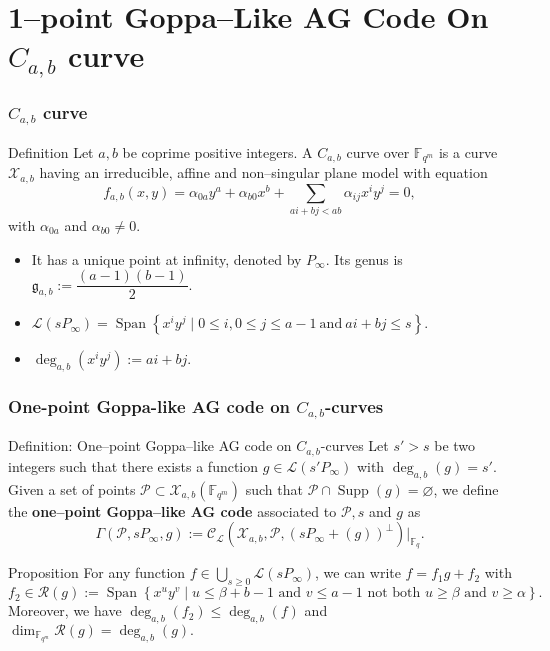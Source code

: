 \documentclass[
10pt, %
%
aspectratio=169, %
]{beamer}
\theoremstyle{plain}%
\theoremstyle{definition}
\theoremstyle{remark}
\newcommand{\calP}{\mathcal{P}}
\newcommand{\calL}{\mathcal{L}}
\newcommand{\calC}{\mathcal{C}}
\newcommand{\calR}{\mathcal{R}}
\newcommand{\calX}{\mathcal{X}}
\newcommand{\fqm}{\mathbb{F}_{q^m}}
\newcommand{\fq}{\mathbb{F}_{q}}
\newcommand{\F}{\mathbb{F}}
\newcommand{\Span}[1]{\operatorname{Span}\left\lbrace #1\right\rbrace }
\newcommand{\Supp}{\operatorname{Supp}}
\newcommand{\degab}[1]{\deg_{a,b}\left(#1\right)}
\begin{document}
\section{1--point Goppa--Like AG Code On $C_{a,b}$ curve}
\begin{frame}
	\frametitle{$C_{a,b}$ curve}
	\begin{block}{Definition \cite{Miu93}}
		Let $a,b$ be coprime positive integers. A $C_{a,b}$ curve over $\fqm$ is a curve $\calX_{a,b}$ having an irreducible, affine and non--singular plane model with equation
		\[f_{a,b}(x,y) = \alpha_{0a}y^a + \alpha_{b0}x^b + \sum_{ai+bj < ab} \alpha_{ij}x^iy^j = 0,\]	
		with $\alpha_{0a}$ and $\alpha_{b0} \neq 0$.
	\end{block}
	
	\begin{itemize}
		\item It has a unique point at infinity, denoted by $P_{\infty}$. Its genus is $\mathfrak{g}_{a,b}:=\dfrac{(a-1)(b-1)}{2}.$
		\item $\calL(sP_{\infty}) = \Span{x^iy^j \mid 0 \leq i, 0\leq j\leq a-1 \ \mathrm{and} \ ai+bj \leq s}.$
		\item $\degab{x^iy^j} := ai+bj.$
	\end{itemize}
\end{frame}
\begin{frame}
\frametitle{One-point Goppa-like AG code on $C_{a,b}$-curves}
\begin{block}{Definition: One--point Goppa--like AG code on $C_{a,b}$-curves}
	Let $s'>s$ be two integers such that there exists a function $g \in \calL(s'P_\infty)$ with $\degab{g}=s'$. Given a set of points  $\calP \subset \calX_{a,b}(\F_{q^m})$ such that $\calP \cap \Supp(g) = \varnothing$, we define the \textbf{one--point Goppa--like AG code} associated to $\calP,s$ and $g$ as 
	\[\Gamma(\calP,sP_\infty,g) := \calC_{\calL}(\calX_{a,b},\calP,(sP_\infty+(g))^{\perp})|_{\fq}.\]
\end{block}
\begin{block}{Proposition \cite{GH00}}
	For any function $f \in \bigcup_{s \geq 0} \calL(s P_\infty)$, we can write $f=f_1g+f_2$ with 
	\[f_2 \in \calR(g):= \Span{x^u y^v \mid u \leq \beta + b-1 \text{ and } v\leq a-1 \text{ not both }  u \geq \beta \text{ and } v \geq \alpha}.\]
	Moreover, we have $\degab{f_2} \leq \degab{f}$ and $\dim_{\fqm} \calR(g) = \degab{g}.$ 
\end{block}

\end{frame}
\end{document}
